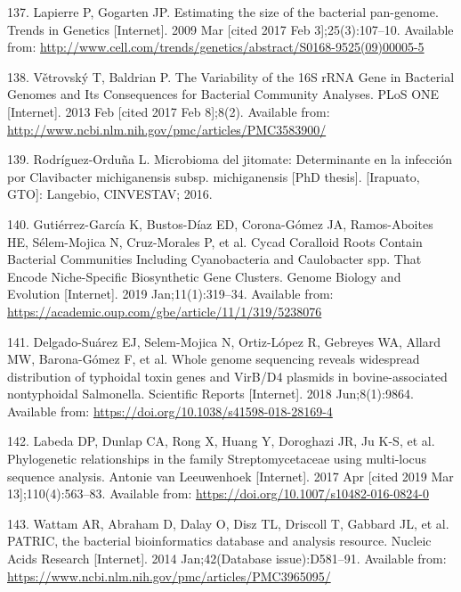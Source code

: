 \documentclass[12pt,twoside]{reedthesis}
\begin{document}
  \hypertarget{ref-lapierre_estimating_2009}{}
  137. Lapierre P, Gogarten JP. Estimating the size of the bacterial
  pan-genome. Trends in Genetics {[}Internet{]}. 2009 Mar {[}cited 2017
  Feb 3{]};25(3):107--10. Available from:
  \url{http://www.cell.com/trends/genetics/abstract/S0168-9525(09)00005-5}
  
  \hypertarget{ref-vetrovsky_variability_2013}{}
  138. Větrovský T, Baldrian P. The Variability of the 16S rRNA Gene in
  Bacterial Genomes and Its Consequences for Bacterial Community Analyses.
  PLoS ONE {[}Internet{]}. 2013 Feb {[}cited 2017 Feb 8{]};8(2). Available
  from: \url{http://www.ncbi.nlm.nih.gov/pmc/articles/PMC3583900/}
  
  \hypertarget{ref-rodriguez_tesis_2016}{}
  139. Rodríguez-Orduña L. Microbioma del jitomate: Determinante en la
  infección por Clavibacter michiganensis subsp. michiganensis
  {[}PhD thesis{]}. {[}Irapuato, GTO{]}: Langebio, CINVESTAV; 2016.
  
  \hypertarget{ref-gutierrez-garcia_cycad_2019}{}
  140. Gutiérrez-García K, Bustos-Díaz ED, Corona-Gómez JA, Ramos-Aboites
  HE, Sélem-Mojica N, Cruz-Morales P, et al. Cycad Coralloid Roots Contain
  Bacterial Communities Including Cyanobacteria and Caulobacter spp. That
  Encode Niche-Specific Biosynthetic Gene Clusters. Genome Biology and
  Evolution {[}Internet{]}. 2019 Jan;11(1):319--34. Available from:
  \url{https://academic.oup.com/gbe/article/11/1/319/5238076}
  
  \hypertarget{ref-delgado-suarez_whole_2018}{}
  141. Delgado-Suárez EJ, Selem-Mojica N, Ortiz-López R, Gebreyes WA,
  Allard MW, Barona-Gómez F, et al. Whole genome sequencing reveals
  widespread distribution of typhoidal toxin genes and VirB/D4 plasmids in
  bovine-associated nontyphoidal Salmonella. Scientific Reports
  {[}Internet{]}. 2018 Jun;8(1):9864. Available from:
  \url{https://doi.org/10.1038/s41598-018-28169-4}
  
  \hypertarget{ref-labeda_phylogenetic_2017}{}
  142. Labeda DP, Dunlap CA, Rong X, Huang Y, Doroghazi JR, Ju K-S, et al.
  Phylogenetic relationships in the family Streptomycetaceae using
  multi-locus sequence analysis. Antonie van Leeuwenhoek {[}Internet{]}.
  2017 Apr {[}cited 2019 Mar 13{]};110(4):563--83. Available from:
  \url{https://doi.org/10.1007/s10482-016-0824-0}
  
  \hypertarget{ref-wattam_patric_2014}{}
  143. Wattam AR, Abraham D, Dalay O, Disz TL, Driscoll T, Gabbard JL, et
  al. PATRIC, the bacterial bioinformatics database and analysis resource.
  Nucleic Acids Research {[}Internet{]}. 2014 Jan;42(Database
  issue):D581--91. Available from:
  \url{https://www.ncbi.nlm.nih.gov/pmc/articles/PMC3965095/}
  
\end{document}
